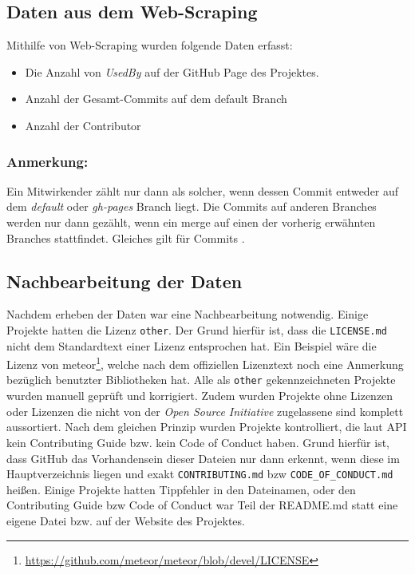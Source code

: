 
\subsection{Daten aus dem Web-Scraping}
Mithilfe von Web-Scraping wurden folgende Daten erfasst:

\begin{itemize}[noitemsep]
    \item Die Anzahl von \textit{UsedBy} auf der GitHub Page des Projektes.
    \item Anzahl der Gesamt-Commits auf dem default Branch
    \item Anzahl der Contributor
\end{itemize}

\subsubsection*{Anmerkung:}
Ein Mitwirkender zählt nur dann als solcher, wenn dessen Commit entweder auf dem \textit{default}
oder \textit{gh-pages} Branch liegt. Die Commits auf anderen Branches werden nur dann gezählt, 
wenn ein merge auf einen der vorherig erwähnten Branches stattfindet. Gleiches gilt für Commits \cite{GHapiDocsCommits}.



\subsection{Nachbearbeitung der Daten}

Nachdem erheben der Daten war eine Nachbearbeitung notwendig. Einige Projekte hatten die Lizenz 
\texttt{other}. Der Grund hierfür ist, dass die \texttt{LICENSE.md} nicht dem Standardtext einer 
Lizenz entsprochen hat. Ein Beispiel wäre die Lizenz von 
meteor\footnote{\url{https://github.com/meteor/meteor/blob/devel/LICENSE}},
welche nach dem offiziellen Lizenztext noch eine Anmerkung bezüglich benutzter Bibliotheken hat.
Alle als \texttt{other} gekennzeichneten Projekte wurden manuell geprüft und korrigiert.
%
Zudem wurden Projekte ohne Lizenzen oder Lizenzen die nicht von der \textit{Open Source Initiative} 
zugelassene sind komplett aussortiert.
%
Nach dem gleichen Prinzip wurden Projekte kontrolliert, die laut API kein Contributing Guide bzw. kein Code 
of Conduct haben. Grund hierfür ist, dass GitHub das Vorhandensein dieser Dateien nur dann erkennt, 
wenn diese im Hauptverzeichnis liegen und exakt \texttt{CONTRIBUTING.md} bzw \texttt{CODE\_OF\_CONDUCT.md} 
heißen. Einige Projekte hatten Tippfehler in den Dateinamen, oder den Contributing Guide bzw Code of Conduct
war Teil der README.md statt eine eigene Datei bzw. auf der Website des Projektes.





